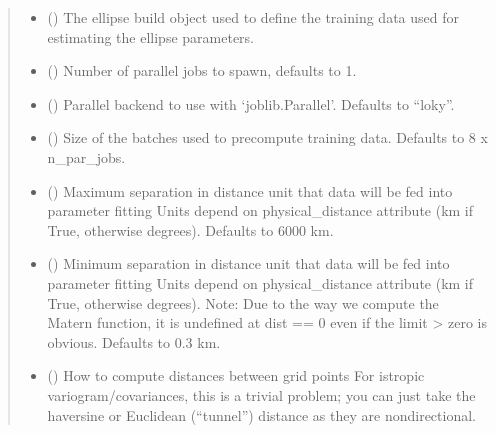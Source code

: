 \documentclass[letterpaper,10pt,english]{sphinxmanual}
\begin{document}
\begin{fulllineitems}
\begin{quote}
\begin{description}
\begin{itemize}
\item {}
\sphinxAtStartPar
{} () \textendash{} The ellipse build object used to define the training data used for
estimating the ellipse parameters.

\item {}
\sphinxAtStartPar
{} () \textendash{} Number of parallel jobs to spawn, defaults to 1.

\item {}
\sphinxAtStartPar
{} () \textendash{} Parallel backend to use with ‘joblib.Parallel’. Defaults to
“loky”.

\item {}
\sphinxAtStartPar
{} () \textendash{} Size of the batches used to precompute training data. Defaults to
8 x n\_par\_jobs.

\item {}
\sphinxAtStartPar
{} () \textendash{} Maximum separation in distance unit that data will be fed
into parameter fitting
Units depend on physical\_distance attribute (km if True, otherwise
degrees). Defaults to 6000 km.

\item {}
\sphinxAtStartPar
{} () \textendash{} Minimum separation in distance unit that data
will be fed into parameter fitting
Units depend on physical\_distance attribute (km if True, otherwise
degrees).
Note: Due to the way we compute the Matern function,
it is undefined at dist == 0 even if the limit \sphinxhyphen{}\textgreater{} zero is obvious.
Defaults to 0.3 km.

\item {}
\sphinxAtStartPar
{} () \textendash{}
\sphinxAtStartPar
How to compute distances between grid points
For istropic variogram/covariances, this is a trivial problem;
you can just take the haversine or
Euclidean (“tunnel”) distance as they are non\sphinxhyphen{}directional.


\end{itemize}
\end{description}
\end{quote}
\end{fulllineitems}
\end{document}
